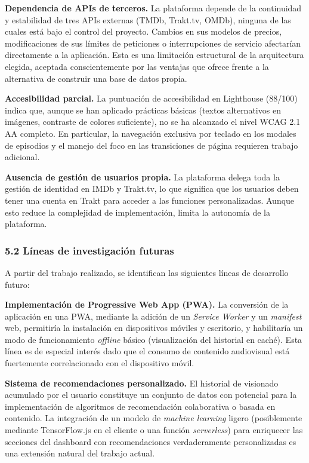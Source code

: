 \documentclass[
]{article}
\begin{document}
\textbf{Dependencia de APIs de terceros.} La plataforma depende de la
continuidad y estabilidad de tres APIs externas (TMDb, Trakt.tv, OMDb),
ninguna de las cuales está bajo el control del proyecto. Cambios en sus
modelos de precios, modificaciones de sus límites de peticiones o
interrupciones de servicio afectarían directamente a la aplicación. Esta
es una limitación estructural de la arquitectura elegida, aceptada
conscientemente por las ventajas que ofrece frente a la alternativa de
construir una base de datos propia.

\textbf{Accesibilidad parcial.} La puntuación de accesibilidad en
Lighthouse (88/100) indica que, aunque se han aplicado prácticas básicas
(textos alternativos en imágenes, contraste de colores suficiente), no
se ha alcanzado el nivel WCAG 2.1 AA completo. En particular, la
navegación exclusiva por teclado en los modales de episodios y el manejo
del foco en las transiciones de página requieren trabajo adicional.

\textbf{Ausencia de gestión de usuarios propia.} La plataforma delega
toda la gestión de identidad en IMDb y Trakt.tv, lo que significa que
los usuarios deben tener una cuenta en Trakt para acceder a las
funciones personalizadas. Aunque esto reduce la complejidad de
implementación, limita la autonomía de la plataforma.

\hypertarget{luxedneas-de-investigaciuxf3n-futuras}{%
\subsubsection{5.2 Líneas de investigación
futuras}\label{luxedneas-de-investigaciuxf3n-futuras}}

A partir del trabajo realizado, se identifican las siguientes líneas de
desarrollo futuro:

\textbf{Implementación de Progressive Web App (PWA).} La conversión de
la aplicación en una PWA, mediante la adición de un \emph{Service
Worker} y un \emph{manifest} web, permitiría la instalación en
dispositivos móviles y escritorio, y habilitaría un modo de
funcionamiento \emph{offline} básico (visualización del historial en
caché). Esta línea es de especial interés dado que el consumo de
contenido audiovisual está fuertemente correlacionado con el dispositivo
móvil.

\textbf{Sistema de recomendaciones personalizado.} El historial de
visionado acumulado por el usuario constituye un conjunto de datos con
potencial para la implementación de algoritmos de recomendación
colaborativa o basada en contenido. La integración de un modelo de
\emph{machine learning} ligero (posiblemente mediante TensorFlow.js en
el cliente o una función \emph{serverless}) para enriquecer las
secciones del dashboard con recomendaciones verdaderamente
personalizadas es una extensión natural del trabajo actual.
\end{document}
